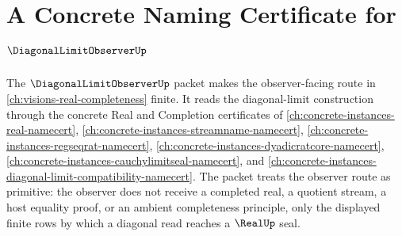 \chapter{A Concrete Naming Certificate for $\DiagonalLimitObserverUp$}
\label{ch:concrete-instances-diagonal-limit-observer-namecert}

The $\DiagonalLimitObserverUp$ packet makes the observer-facing route in \autoref{ch:visions-real-completeness} finite. It reads the diagonal-limit construction through the concrete Real and Completion certificates of \autoref{ch:concrete-instances-real-namecert}, \autoref{ch:concrete-instances-streamname-namecert}, \autoref{ch:concrete-instances-regseqrat-namecert}, \autoref{ch:concrete-instances-dyadicratcore-namecert}, \autoref{ch:concrete-instances-cauchylimitseal-namecert}, and \autoref{ch:concrete-instances-diagonal-limit-compatibility-namecert}. The packet treats the observer route as primitive: the observer does not receive a completed real, a quotient stream, a host equality proof, or an ambient completeness principle, only the displayed finite rows by which a diagonal read reaches a $\RealUp$ seal.



